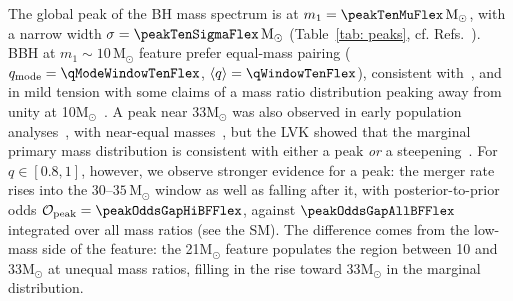 \documentclass[%
    aps,
    prl,
    reprint,
    superscriptaddress,
    nolongbibliography,
    nobibnotes,
    nofootinbib,
    linenumbers,
    amsmath,amssymb,
]{revtex4-2}
\newcommand{\Msun}{\ensuremath{\mathrm{M}_{\odot}}}
\newcommand{\featTen}{10\xspace}
\newcommand{\featTwenty}{21\xspace}
\newcommand{\featThirtyFive}{33\xspace}
\begin{document}
The global peak of the \ac{BH} mass spectrum is at $m_1 = \peakTenMuFlex\,\Msun$, with a narrow width $\sigma = \peakTenSigmaFlex\,\Msun$ (Table~\ref{tab: peaks}, cf. Refs.~\cite{LIGOScientific:2020kqk, Talbot:2018cva, Tiwari:2020otp, Edelman:2021zkw, KAGRA:2021duu, Callister:2023tgi, LIGOScientific:2025pvj, LIGOScientific:2026ctl}). \ac{BBH} at $m_1\sim\featTen\,\Msun$ feature prefer equal-mass pairing ($q_{\rm mode} = \qModeWindowTenFlex$, $\langle q \rangle = \qWindowTenFlex$), consistent with~\cite{Farah:2023swu, LIGOScientific:2026ctl, Flanagan:2026ayy}, and in mild tension with some claims of a mass ratio distribution peaking away from unity at \featTen $\Msun$~\cite{Godfrey:2023oxb, Sadiq:2023zee, Sridhar:2025kvi, LIGOScientific:2025pvj}. A peak near \featThirtyFive $\Msun$ was also observed in early population analyses~\cite{Talbot:2018cva, LIGOScientific:2018jsj, LIGOScientific:2020kqk, KAGRA:2021duu, Farah:2023vsc}, with near-equal masses~\cite{Roy:2025ktr, Sridhar:2025kvi}, but the \ac{LVK} showed that the marginal primary mass distribution is consistent with either a peak \textit{or} a steepening~\cite{LIGOScientific:2025pvj, LIGOScientific:2026ctl}. For $q \in [0.8, 1]$, however, we observe stronger evidence for a peak: the merger rate rises into the $30$--$35\,\Msun$ window as well as falling after it, with posterior-to-prior odds $\mathcal{O}_{\rm peak} = \peakOddsGapHiBFFlex$, against $\peakOddsGapAllBFFlex$ integrated over all mass ratios (see the SM). The difference comes from the low-mass side of the feature: the \featTwenty $\Msun$ feature populates the region between \featTen and \featThirtyFive $\Msun$ at unequal mass ratios, filling in the rise toward \featThirtyFive $\Msun$ in the marginal distribution. %
\end{document}
